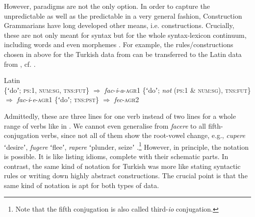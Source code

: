 \documentclass[output=paper]{langsci/langscibook}
\begin{document}
However, paradigms are not the only option. In order to capture the unpredictable as well as the predictable in a very general fashion, Construction Grammarians have long developed other means, i.e. constructions. Crucially, these are not only meant for syntax but for the whole syntax-lexicon continuum, including words and even morphemes \citep[5]{Goldberg2006}. For example, the rules/constructions chosen in  above for the Turkish data from  can be transferred to the Latin data from , cf. .


\ea \label{ex:reiner:3} 
{Latin}\\ 
\ea \{ʻdoʼ; \textsc{ps}:1, \textsc{num}:\textsc{sg}, \textsc{tns}:\textsc{fut}\} ${\Rightarrow}$ \textit{fac}{}-\textit{i}{}-\textit{a}{}-\textsc{agr}1
\ex \{ʻdoʼ; \textit{not} (\textsc{ps}:1 \& \textsc{num}:\textsc{sg}), \textsc{tns}:\textsc{fut}\} ${\Rightarrow}$ \textit{fac}{}-\textit{i}{}-\textit{e}{}-\textsc{agr}1
\ex \{ʻdoʼ; \textsc{tns}:\textsc{pst}\} ${\Rightarrow}$ \textit{fec}{}-\textsc{agr}2
\z\z

Admittedly, these are three lines for one verb instead of two lines for a whole range of verbs like in . We cannot even generalise from \textit{facere} to all fifth-conjugation verbs, since not all of them show the root-vowel change, e.g., \textit{cupere} ʻdesireʼ, \textit{fugere} ʻfleeʼ, \textit{rapere} ʻplunder, seizeʼ \citep{BennettEdwin1918, GreenoughEtAl}.\footnote{Note that the fifth conjugation is also called third-\textit{io} conjugation.} However, in principle, the notation is possible. It is like listing idioms, complete with their schematic parts. In contrast, the same kind of notation for Turkish was more like stating syntactic rules or writing down highly abstract constructions. The crucial point is that the same kind of notation is apt for both types of data.
\end{document}
